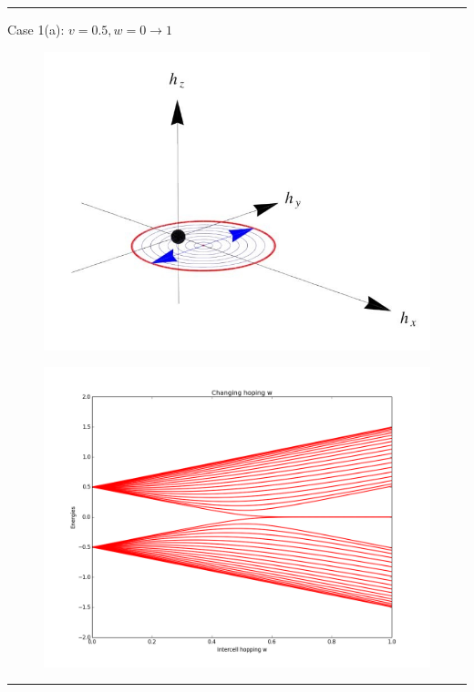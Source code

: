 \documentclass[letterpaper,10pt,english]{sphinxmanual}
\begin{document}
\bigskip\hrule{}\bigskip


Case 1(a): \(v=0.5, w=0\to 1\)
\begin{figure}[htbp]
\centering

\includegraphics[width=0.700\linewidth]{a.jpg}
\end{figure}
\begin{figure}[htbp]
\centering

\includegraphics[width=0.700\linewidth]{figure_1a.png}
\end{figure}


\bigskip\hrule{}\bigskip
\end{document}
